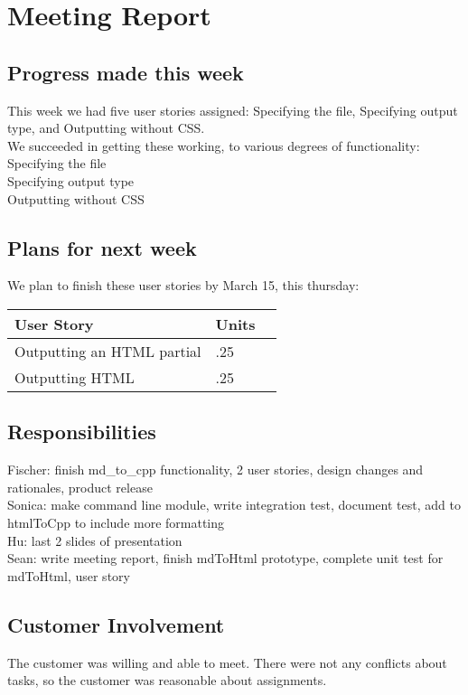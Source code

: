 \section{Meeting Report}

\subsection{Progress made this week}
This week we had five user stories assigned: Specifying the file, Specifying output type, and Outputting without CSS.\\
We succeeded in getting these working, to various degrees of functionality: \\
Specifying the file\\
Specifying output type\\
Outputting without CSS\\



\subsection{Plans for next week}
We plan to finish these user stories by March 15, this thursday:

 \begin{center}
    \begin{tabular}{ | l | l | p{5cm} |}
    \hline
    User Story & Units \\ \hline
    Outputting an HTML partial & .25 \\ \hline
    Outputting HTML & .25 \\ \hline
    \end{tabular}
\end{center}


\subsection{Responsibilities}
Fischer: finish md\_to\_cpp functionality, 2 user stories, design changes and rationales, product release  \\
Sonica: make command line module, write integration test, document test, add to htmlToCpp to include more formatting\\
Hu: last 2 slides of presentation \\
Sean: write meeting report, finish mdToHtml prototype, complete unit test for mdToHtml, user story\\

\subsection{Customer Involvement}
The customer was willing and able to meet.
There were not any conflicts about tasks, so the customer was reasonable about assignments.

